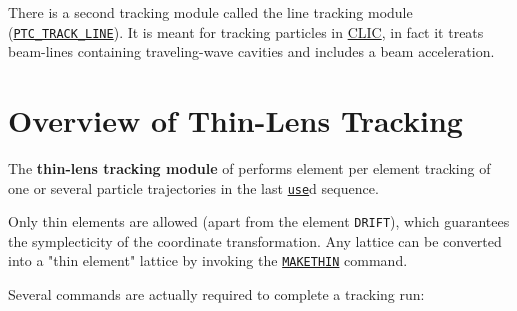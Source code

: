 There is a second \ptc tracking module called the line tracking module
(\hyperref[sec:ptc_track_line]{\tt PTC\_TRACK\_LINE}). It is
meant for tracking particles in 
\href{http://clic-study.web.cern.ch/CLIC-Study/}{CLIC}, in fact it
treats beam-lines containing traveling-wave cavities and includes a beam
acceleration. 






\section{Overview of Thin-Lens Tracking} %
\label{sec:trackoverview}

The {\bf thin-lens tracking module} of \madx performs element per
element tracking of one or several particle trajectories in the last
\href{../control/general.html#use}{{\tt use}}d sequence.  
 

Only thin elements are allowed (apart from the element {\tt DRIFT}),
which guarantees the symplecticity of the coordinate transformation. Any
lattice can be converted into a "thin element" lattice by invoking the
\hyperref[chap:maketin]{\tt MAKETHIN} command. 

Several commands are actually required to complete a tracking run:



